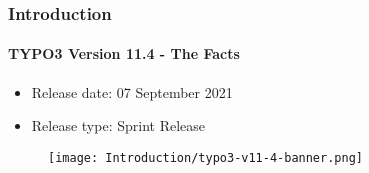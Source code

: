 %

\begin{frame}[fragile]
	\frametitle{Introduction}
	\framesubtitle{TYPO3 Version 11.4 - The Facts}

	\begin{itemize}
		\item Release date: 07 September 2021
		\item Release type: Sprint Release
	\end{itemize}

	\begin{figure}
		\texttt{[image: Introduction/typo3-v11-4-banner.png]}
	\end{figure}

\end{frame}

